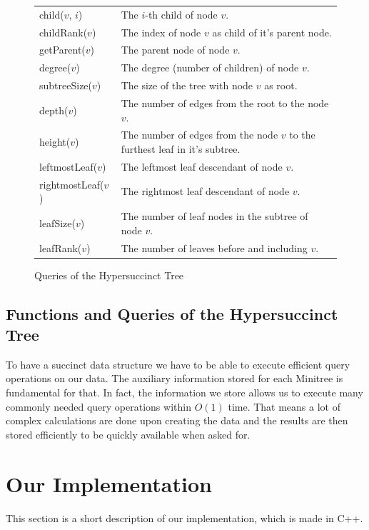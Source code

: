 \documentclass{article}
\begin{document}
\begin{figure}[H]
\begin{tabular}{ |p{3.5cm}p{8cm}|} 
 \hline
 child($v$, $i$) & The $i$-th child of node $v$. \\
 childRank($v$) & The index of node $v$ as child of it's parent node. \\
 getParent($v$) & The parent node of node $v$. \\
 degree($v$) & The degree (number of children) of node $v$. \\
 subtreeSize($v$) & The size of the tree with node $v$ as root. \\
 depth($v$) &  The number of edges from the root to the node $v$. \\
 height($v$) & The number of edges from the node $v$ to the furthest leaf in it's subtree. \\
 leftmostLeaf($v$) & The leftmost leaf descendant of node $v$. \\
 rightmostLeaf($v$) & The rightmost leaf descendant of node $v$. \\
 leafSize($v$) & The number of leaf nodes in the subtree of node $v$. \\
 leafRank($v$) & The number of leaves before and including $v$. \\
 \hline
\end{tabular}
\caption{Queries of the Hypersuccinct Tree}
\label{2.1:table1}
\end{figure}

\subsection{Functions and Queries of the Hypersuccinct Tree} \label{Functions and Queries of the Hypersuccinct Tree}
To have a succinct data structure we have to be able to execute efficient query operations on our data. The auxiliary information stored for each Minitree is fundamental for that. In fact, the information we store allows us to execute many commonly needed query operations within $O(1)$ time. That means a lot of complex calculations are done upon creating the data and the results are then stored efficiently to be quickly available when asked for. \\

\section{Our Implementation} \label{Our Implementation}
This section is a short description of our implementation, which is made in C++.
\end{document}
